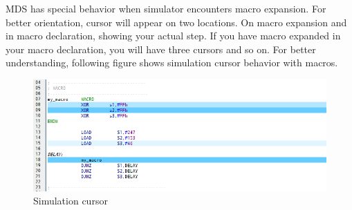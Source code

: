         MDS has special behavior when simulator encounters macro expansion. For better orientation, cursor will appear on two locations.
        On macro expansion and in macro declaration, showing your actual step. If you have macro expanded in your macro declaration, you will have
        three cursors and so on. For better understanding, following figure shows simulation cursor behavior with macros.
        \begin{figure}[h!]
            \centering
            \includegraphics[width=\textwidth]{img/NewImg/simulationcursor2.png}
            \caption{Simulation cursor}
        \end{figure}        
    


